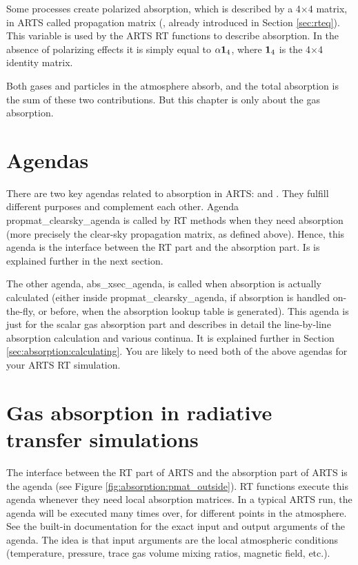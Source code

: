 Some processes create polarized absorption, which is described by a
4$\times$4 matrix, in ARTS called propagation matrix
(, already introduced in Section \ref{sec:rteq}).  This variable is used by the ARTS RT
functions to describe absorption.  In the absence of polarizing
effects it is simply equal to ${\alpha} \mathbf{1}_4$, where $\mathbf{1}_4$
is the 4$\times$4 identity matrix. 

Both gases
and particles in the atmosphere absorb, and the total absorption is
the sum of these two contributions. But this chapter is only about the
gas absorption.

\section{Agendas}
\label{sec:absorption:agendas}

There are two key agendas related to absorption in ARTS:
 and
.  They fulfill different purposes and
complement each other.  Agenda propmat\_clearsky\_agenda is called by
RT methods when they need absorption (more precisely the clear-sky
propagation matrix, as defined above). Hence, this agenda is the
interface between the RT part and the absorption part. Is is explained
further in the next section. 

The other agenda, abs\_xsec\_agenda, is called when absorption is
actually calculated (either inside propmat\_clearsky\_agenda, if
absorption is handled on-the-fly, or before, when the absorption
lookup table is generated).  This agenda is just for the scalar gas
absorption part and describes in detail the line-by-line absorption
calculation and various continua.  It is explained further in Section
\ref{sec:absorption:calculating}.  You are likely to need both of the
above agendas for your ARTS RT simulation.


\section{Gas absorption in radiative transfer simulations}
\label{sec:absorption:abs-rt}

The interface between the RT part of ARTS and the
absorption part of ARTS is the agenda
 (see Figure \ref{fig:absorption:pmat_outside}).  RT functions execute this
agenda whenever they need local absorption matrices.  In a typical
ARTS run, the agenda will be executed many times over, for different
points in the atmosphere.  See the built-in documentation for the
exact input and output arguments of the agenda.  The idea is that
input arguments are the local atmospheric conditions (temperature,
pressure, trace gas volume mixing ratios, magnetic field, etc.).

